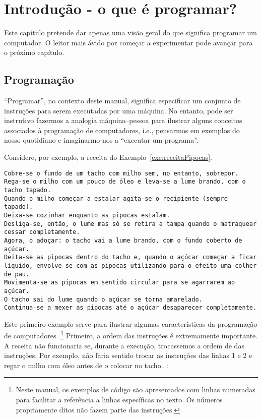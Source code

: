\chapter{Introdução - o que é programar?}

Este capítulo pretende dar apenas uma visão geral do que significa programar um computador. O leitor mais ávido por começar a experimentar pode avançar para o próximo capítulo.

\section{Programação}
``Programar'', no contexto deste manual, significa especificar um conjunto de instruções para serem executadas por uma máquina. No entanto, pode ser instrutivo fazermos a analogia máquina--pessoa para ilustrar alguns conceitos associados à programação de computadores, i.e., pensarmos em exemplos do nosso quotidiano e imaginarmo-nos a ``executar um programa''.


Considere, por exemplo, a receita do Exemplo~\ref{exe:receitaPipocas}.

\begin{lstlisting}[caption={Receita de pipocas. Adaptado de \url{http://lifestyle.sapo.pt/sabores/receitas/pipocas-doces-caseiras}.}, label=exe:receitaPipocas]
Cobre-se o fundo de um tacho com milho sem, no entanto, sobrepor. 
Rega-se o milho com um pouco de óleo e leva-se a lume brando, com o tacho tapado. 
Quando o milho começar a estalar agita-se o recipiente (sempre tapado).
Deixa-se cozinhar enquanto as pipocas estalam. 
Desliga-se, então, o lume mas só se retira a tampa quando o matraquear cessar completamente.
Agora, o adoçar: o tacho vai a lume brando, com o fundo coberto de açúcar. 
Deita-se as pipocas dentro do tacho e, quando o açúcar começar a ficar líquido, envolve-se com as pipocas utilizando para o efeito uma colher de pau. 
Movimenta-se as pipocas em sentido circular para se agarrarem ao açúcar. 
O tacho sai do lume quando o açúcar se torna amarelado.
Continua-se a mexer as pipocas até o açúcar desaparecer completamente.
\end{lstlisting}

Este primeiro exemplo serve para ilustrar algumas características da programação de computadores.%
\footnote{
Neste manual, os exemplos de código são apresentados com linhas numeradas para facilitar a referência a linhas específicas no texto. Os números propriamente ditos não fazem parte das instruções.
} %
Primeiro, a ordem das instruções é extremamente importante. A receita não funcionaria se, durante a execução, trocassemos a ordem de das instruções. Por exemplo, não faria sentido trocar as instruções das linhas 1 e 2 e regar o milho com  óleo antes de o colocar no tacho...:

